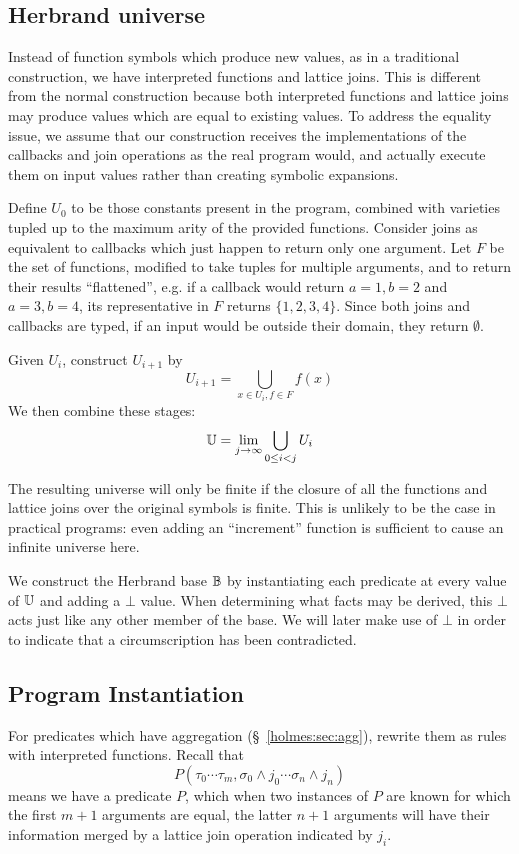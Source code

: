 \subsection{Herbrand universe}
\label{formal:sec:callbacks}
Instead of function symbols which produce new values, as in a traditional construction, we have interpreted functions and lattice joins.
This is different from the normal construction because both interpreted functions and lattice joins may produce values which are equal to existing values.
To address the equality issue, we assume that our construction receives the implementations of the callbacks and join operations as the real program would, and actually execute them on input values rather than creating symbolic expansions.

Define $U_0$ to be those constants present in the program, combined with varieties tupled up to the maximum arity of the provided functions.
Consider joins as equivalent to callbacks which just happen to return only one argument.
Let $F$ be the set of functions, modified to take tuples for multiple arguments, and to return their results ``flattened'', e.g. if a callback would return $a = 1, b = 2$ and $a = 3, b = 4$, its representative in $F$ returns $\{1, 2, 3, 4\}$.
Since both joins and callbacks are typed, if an input would be outside their domain, they return $\emptyset$.

Given $U_i$, construct $U_{i + 1}$ by
\[
	U_{i + 1} = \bigcup_{x \in U_i, f \in F} f(x)
\]
We then combine these stages:
\[
	\mathbb{U} = \lim_{j \rightarrow \infty} \bigcup_{0 \leq i < j} U_i
\]

The resulting universe will only be finite if the closure of all the functions and lattice joins over the original symbols is finite.
This is unlikely to be the case in practical programs: even adding an ``increment'' function is sufficient to cause an infinite universe here.

We construct the Herbrand base $\mathbb{B}$ by instantiating each predicate at every value of $\mathbb{U}$ and adding a $\bot$ value.
When determining what facts may be derived, this $\bot$ acts just like any other member of the base.
We will later make use of $\bot$ in order to indicate that a circumscription has been contradicted.

\subsection{Program Instantiation}
For predicates which have aggregation (\S~\ref{holmes:sec:agg}), rewrite them as rules with interpreted functions.
Recall that
\[
	P(\tau_0 \cdots \tau_m, \sigma_0\wedge j_0 \cdots \sigma_n \wedge j_n)
\]
means we have a predicate $P$, which when two instances of $P$ are known for which the first $m + 1$ arguments are equal, the latter $n + 1$ arguments will have their information merged by a lattice join operation indicated by $j_i$.

